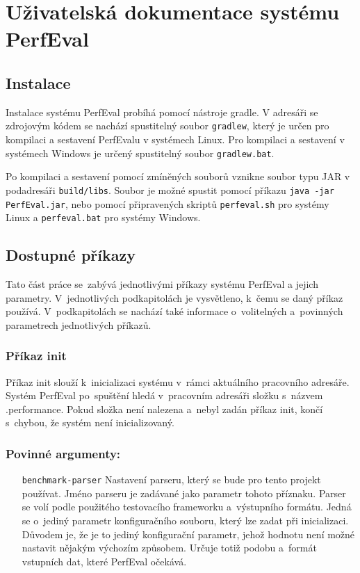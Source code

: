 \chapter{Uživatelská dokumentace systému PerfEval}

\section{Instalace}

Instalace systému PerfEval probíhá pomocí nástroje gradle. V adresáři se zdrojovým kódem se nachází
spustitelný soubor \texttt{gradlew}, který je určen pro kompilaci a sestavení PerfEvalu v systémech Linux.
Pro kompilaci a sestavení v systémech Windows je určený spustitelný soubor \texttt{gradlew.bat}.

Po kompilaci a sestavení pomocí zmíněných souborů vznikne soubor typu JAR v podadresáři \texttt{build/libs}.
Soubor je možné spustit pomocí příkazu \texttt{java -jar PerfEval.jar}, nebo pomocí připravených skriptů
\texttt{perfeval.sh} pro systémy Linux a \texttt{perfeval.bat} pro systémy Windows.

\section{Dostupné příkazy}

Tato část práce se~zabývá jednotlivými příkazy systému PerfEval a jejich parametry.
V~jednotlivých podkapitolách je vysvětleno, k~čemu se daný příkaz používá. V~podkapitolách
se nachází také informace o~volitelných a~povinných parametrech jednotlivých příkazů.

\subsection{Příkaz init}

Příkaz init slouží k~inicializaci systému v~rámci aktuálního pracovního adresáře.
Systém PerfEval po~spuštění hledá v~pracovním adresáři složku s~názvem .performance. Pokud složka
není nalezena a~nebyl zadán příkaz init, končí s~chybou, že systém není inicializovaný.

\subsection*{Povinné argumenty:}
\begin{itemize}[label=\texttt{\textbf{\textendash}}]
    \item[\texttt{benchmark-parser}] Nastavení parseru, který se bude pro tento projekt používat.
        Jméno parseru je zadávané jako parametr tohoto příznaku.
        Parser se volí podle použitého testovacího frameworku a~výstupního formátu.
        Jedná se o~jediný parametr konfiguračního souboru, který lze zadat při inicializaci.
        Důvodem je, že je to jediný konfigurační parametr, jehož hodnotu není možné nastavit nějakým výchozím způsobem.
        Určuje totiž podobu a~formát vstupních dat, které PerfEval očekává.
\end{itemize}

